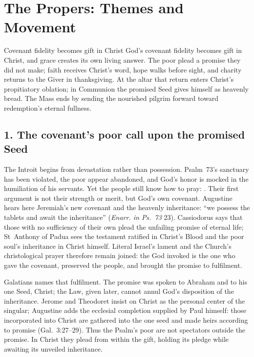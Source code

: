 \section*{The Propers: Themes and Movement}
\label{triptych:brief-synthesis:start}
\begingroup\footnotesize
\setlength{\parskip}{0.32em}

\begin{studybox}{Covenant fidelity becomes gift in Christ}
God's covenant fidelity becomes gift in Christ, and grace creates its own
living answer. The poor plead a promise they did not make; faith receives
Christ's word, hope walks before sight, and charity returns to the Giver in
thanksgiving. At the altar that return enters Christ's propitiatory oblation;
in Communion the promised Seed gives himself as heavenly bread. The Mass ends
by sending the nourished pilgrim forward toward redemption's eternal fullness.
\end{studybox}

\subsection*{1. The covenant's poor call upon the promised Seed\enspace{}}

The Introit begins from devastation rather than possession. Psalm~73's
sanctuary has been violated, the poor appear abandoned, and God's honor is
mocked in the humiliation of his servants. Yet the people still know how to
pray: . Their first argument is not
their strength or merit, but God's own covenant. Augustine hears here
Jeremiah's new covenant and the heavenly inheritance: ``we possess the tablets
and await the inheritance'' (\emph{Enarr. in Ps.~73} 23). Cassiodorus says that
those with no sufficiency of their own plead the unfailing promise of eternal
life; St~Anthony of Padua sees the testament ratified in Christ's Blood and the
poor soul's inheritance in Christ himself. Literal Israel's lament and the
Church's christological prayer therefore remain joined: the God invoked is the
one who gave the covenant, preserved the people, and brought the promise to
fulfilment.

Galatians names that fulfilment. The promise was spoken to Abraham and to his
one Seed, Christ; the Law, given later, cannot annul God's disposition of the
inheritance. Jerome and Theodoret insist on Christ as the personal center of
the singular; Augustine adds the ecclesial completion supplied by Paul himself:
those incorporated into Christ are gathered into the one seed and made heirs
according to promise (Gal.~3:27--29). Thus the Psalm's poor are not spectators
outside the promise. In Christ they plead from within the gift, holding its
pledge while awaiting its unveiled inheritance.

